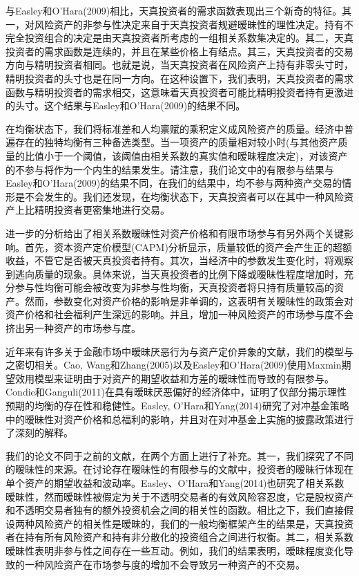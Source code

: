 \documentclass[10.0pt]{article}
\begin{document}
与Easley和O'Hara(2009)相比，天真投资者的需求函数表现出三个新奇的特征。其一，对风险资产的非参与性决定来自于天真投资者规避暧昧性的理性决定。持有不完全投资组合的决定是由天真投资者所考虑的一组相关系数集决定的。其二，天真投资者的需求函数是连续的，并且在某些价格上有结点。其三，天真投资者的交易方向与精明投资者相同。也就是说，当天真投资者在风险资产上持有非零头寸时，精明投资者的头寸也是在同一方向。在这种设置下，我们表明，天真投资者的需求函数与精明投资者的需求相交，这意味着天真投资者可能比精明投资者持有更激进的头寸。这个结果与Easley和O'Hara(2009)的结果不同。


在均衡状态下，我们将标准差和人均禀赋的乘积定义成风险资产的质量。经济中普遍存在的独特均衡有三种备选类型。当一项资产的质量相对较小时(与其他资产质量的比值小于一个阈值，该阈值由相关系数的真实值和暧昧程度决定)，对该资产的不参与将作为一个内生的结果发生。请注意，我们论文中的有限参与结果与Easley和O'Hara(2009)的结果不同，在我们的结果中，均不参与两种资产交易的情形是不会发生的。我们还发现，在均衡状态下，天真投资者可以在其中一种风险资产上比精明投资者更密集地进行交易。

进一步的分析给出了相关系数暧昧性对资产价格和有限市场参与有另外两个关键影响。首先，资本资产定价模型(CAPM)分析显示，质量较低的资产会产生正的超额收益，不管它是否被天真投资者持有。其次，当经济中的参数发生变化时，将观察到逃向质量的现象。具体来说，当天真投资者的比例下降或暧昧性程度增加时，充分参与性均衡可能会被改变为非参与性均衡，天真投资者将只持有质量较高的资产。然而，参数变化对资产价格的影响是非单调的，这表明有关暧昧性的政策会对资产价格和社会福利产生深远的影响。并且，增加一种风险资产的市场参与度不会挤出另一种资产的市场参与度。



近年来有许多关于金融市场中暧昧厌恶行为与资产定价异象的文献，我们的模型与之密切相关。Cao, Wang和Zhang(2005)以及Easley和O'Hara(2009)使用Maxmin期望效用模型来证明由于对资产的期望收益和方差的暧昧性而导致的有限参与。Condie和Ganguli(2011)在具有暧昧厌恶偏好的经济体中，证明了仅部分揭示理性预期的均衡的存在性和稳健性。Easley, O'Hara和Yang(2014)研究了对冲基金策略中的暧昧性对资产价格和总福利的影响，并且对在对冲基金上实施的披露政策进行了深刻的解释。



我们的论文不同于之前的文献，在两个方面上进行了补充。其一，我们探究了不同的暧昧性的来源。在讨论存在暧昧性的有限参与的文献中，投资者的暧昧行体现在单个资产的期望收益和波动率。Easley、O'Hara和Yang(2014)也研究了相关系数暧昧性，然而暧昧性被假定为关于不透明交易者的有效风险容忍度，它是股权资产和不透明交易者独有的额外投资机会之间的相关性的函数。相比之下，我们直接假设两种风险资产的相关性是暧昧的，我们的一般均衡框架产生的结果是，天真投资者在持有所有风险资产和持有非分散化的投资组合之间进行权衡。其二，相关系数暧昧性表明非参与性之间存在一些互动。例如，我们的结果表明，暧昧程度变化导致的一种风险资产在市场参与度的增加不会导致另一种资产的不交易。
\end{document}
